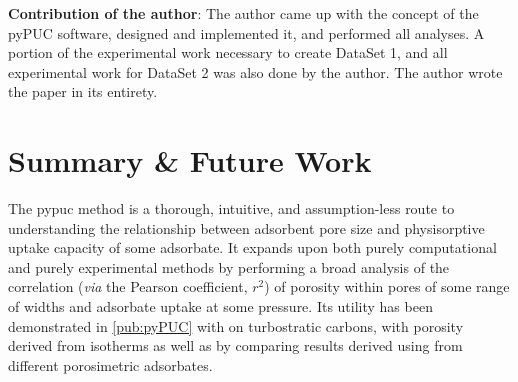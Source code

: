 \textbf{Contribution of the author}: The author came up with the concept of the pyPUC software, designed and implemented it, and performed all analyses. A portion of the experimental work necessary to create DataSet 1, and all experimental work for DataSet 2 was also done by the author. The author wrote the paper in its entirety.

\setcounter{opagenum}{\thepage}

\newpage

\setlength{\originalVOffset}{\voffset}   
\setlength{\originalHOffset}{\hoffset}

\setlength{\voffset}{0cm}
\setlength{\hoffset}{0cm}

\setlength{\voffset}{\originalVOffset}
\setlength{\hoffset}{\originalHOffset}




\section{Summary \& Future Work}
The \acrshort{pypuc} method is a thorough, intuitive, and assumption-less route to understanding the relationship between \gls{adsorbent} pore size and physisorptive uptake capacity of some \gls{adsorbate}. It expands upon both purely computational and purely experimental methods by performing a broad analysis of the correlation (\textit{via} the Pearson coefficient, $r^2$) of porosity within pores of some range of widths and \gls{adsorbate} uptake at some pressure. Its utility has been demonstrated in \ref{pub:pyPUC} with  on \glspl{turbostratic carbon}, with porosity derived from  isotherms as well as by comparing results derived using  from different porosimetric \glspl{adsorbate}.

